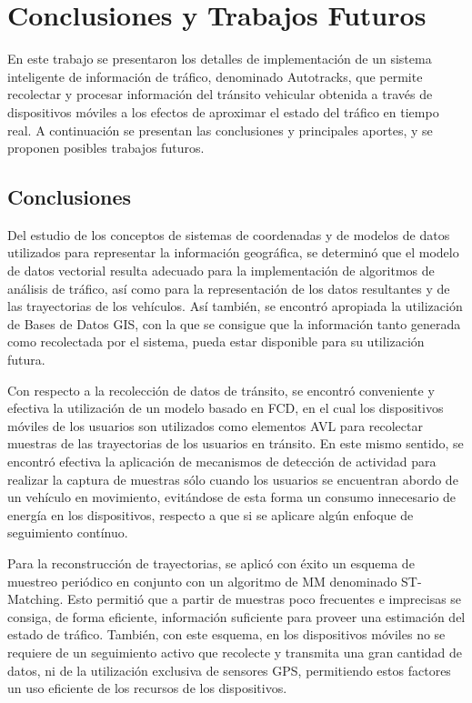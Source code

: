 \chapter{Conclusiones y Trabajos Futuros}
\label{cap:8}

En este trabajo se presentaron los detalles de implementación de un sistema inteligente de información de tráfico, denominado Autotracks, que permite recolectar y procesar información del tránsito vehicular obtenida a través de dispositivos móviles a los efectos de aproximar el estado del tráfico en tiempo real. A continuación se presentan las conclusiones y principales aportes, y se proponen posibles trabajos futuros.

\section{Conclusiones}

Del estudio de los conceptos de sistemas de coordenadas y de modelos de datos utilizados para representar la información geográfica, se determinó que el modelo de datos vectorial resulta adecuado para la implementación de algoritmos de análisis de tráfico, así como para la representación de los datos resultantes y de las trayectorias de los vehículos. Así también, se encontró apropiada la utilización de Bases de Datos GIS, con la que se consigue que la información tanto generada como recolectada por el sistema, pueda estar disponible para su utilización futura.

Con respecto a la recolección de datos de tránsito, se encontró conveniente y efectiva la utilización de un modelo basado en FCD, en el cual los dispositivos móviles de los usuarios son utilizados como elementos AVL para recolectar muestras de las trayectorias de los usuarios en tránsito. En este mismo sentido, se encontró efectiva la aplicación de mecanismos de detección de actividad para realizar la captura de muestras sólo cuando los usuarios se encuentran abordo de un vehículo en movimiento, evitándose de esta forma un consumo innecesario de energía en los dispositivos, respecto a que si se aplicare algún enfoque de seguimiento contínuo.

Para la reconstrucción de trayectorias, se aplicó con éxito un esquema de muestreo periódico en conjunto con un algoritmo de MM denominado ST-Matching. Esto permitió que a partir de muestras poco frecuentes e imprecisas se consiga, de forma eficiente, información suficiente para proveer una estimación del estado de tráfico. También, con este esquema, en los dispositivos móviles no se requiere de un seguimiento activo que recolecte y transmita una gran cantidad de datos, ni de la utilización exclusiva de sensores GPS, permitiendo estos factores un uso eficiente de los recursos de los dispositivos.

